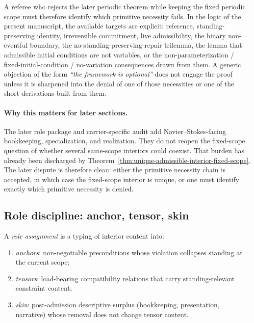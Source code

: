 \begin{tcolorbox}[title={Forcedness test for the manuscript claim}, colback=blue!2!white, colframe=blue!55!black]
\small
A referee who rejects the later periodic theorem while keeping the fixed periodic scope must therefore identify which primitive necessity fails. In the logic of the present manuscript, the available targets are explicit: reference, standing-preserving identity, irreversible commitment, live admissibility, the binary non-eventful boundary, the no-standing-preserving-repair trilemma, the lemma that admissible initial conditions are not variables, or the non-parameterization / fixed-initial-condition / no-variation consequences drawn from them. A generic objection of the form \emph{``the framework is optional''} does not engage the proof unless it is sharpened into the denial of one of those necessities or one of the short derivations built from them.
\end{tcolorbox}

\paragraph{Why this matters for later sections.}
The later role package and carrier-specific audit add Navier--Stokes-facing bookkeeping, specialization, and realization. They do not reopen the fixed-scope question of whether several same-scope interiors could coexist. That burden has already been discharged by Theorem~\ref{thm:unique-admissible-interior-fixed-scope}. The later dispute is therefore clean: either the primitive necessity chain is accepted, in which case the fixed-scope interior is unique, or one must identify exactly which primitive necessity is denied.

\subsection{Role discipline: anchor, tensor, skin}

\begin{definition}\label{def:role-triad}
A \emph{role assignment} is a typing of interior content into:
\begin{enumerate}[label=(\roman*), leftmargin=2.2em]
\item \emph{anchors}: non-negotiable preconditions whose violation collapses standing at the current scope;
\item \emph{tensors}: load-bearing compatibility relations that carry standing-relevant constraint content;
\item \emph{skin}: post-admission descriptive surplus (bookkeeping, presentation, narrative) whose removal
does not change tensor content.
\end{enumerate}
\end{definition}

